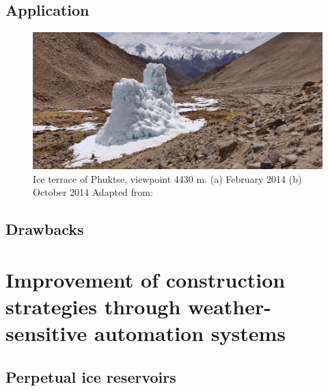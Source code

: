 \subsection{Application}

\begin{figure}[t]
\centering
\includegraphics[width=12cm]{figs/IS_example.jpg}

\caption{Ice terrace of Phuktse, viewpoint 4430 m. (a) February 2014 (b) October 2014 Adapted from: \cite{nusserSociohydrologyArtificialGlaciers2019}}

\label{fig:ISexample}
\end{figure}

\subsection{Drawbacks}

\section{Improvement of construction strategies through weather-sensitive automation systems}

\subsection{Perpetual ice reservoirs}

